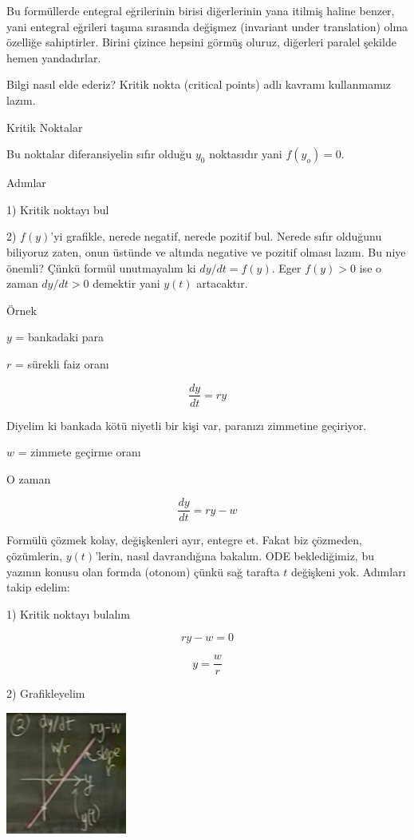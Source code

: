 \documentclass[12pt,fleqn]{article}\usepackage{../../common}
\begin{document}
Bu formüllerde entegral eğrilerinin birisi diğerlerinin yana itilmiş haline
benzer, yani entegral eğrileri taşıma sırasında değişmez (invariant under
translation) olma özelliğe sahiptirler. Birini çizince hepsini görmüş
oluruz, diğerleri paralel şekilde hemen yandadırlar.

Bilgi nasıl elde ederiz? Kritik nokta (critical points) adlı kavramı
kullanmamız lazım.

Kritik Noktalar

Bu noktalar diferansiyelin sıfır olduğu $y_0$ noktasıdır yani $f(y_o) = 0$.

Adımlar

1) Kritik noktayı bul

2) $f(y)$'yi grafikle, nerede negatif, nerede pozitif bul. Nerede sıfır
olduğunu biliyoruz zaten, onun üstünde ve altında negative ve pozitif
olması lazım. Bu niye önemli? Çünkü formül unutmayalım ki $dy/dt =
f(y)$.  Eger $f(y) > 0$ ise o zaman $dy/dt > 0$ demektir yani $y(t)$ artacaktır.

Örnek

$y$ = bankadaki para 

$r$ = sürekli faiz oranı

$$ \frac{dy}{dt} = ry $$

Diyelim ki bankada kötü niyetli bir kişi var, paranızı zimmetine
geçiriyor. 

$w$ = zimmete geçirme oranı

O zaman

$$ \frac{dy}{dt} = ry - w$$

Formülü çözmek kolay, değişkenleri ayır, entegre et. Fakat biz çözmeden,
çözümlerin, $y(t)$'lerin, nasıl davrandığına bakalım. ODE beklediğimiz, bu
yazının konusu olan formda (otonom) çünkü sağ tarafta $t$ değişkeni
yok. Adımları takip edelim:

1) Kritik noktayı bulalım

$$ ry - w = 0 $$

$$ y = \frac{w}{r} $$

2) Grafikleyelim

\includegraphics[height=4cm]{5_4.png}
\end{document}
